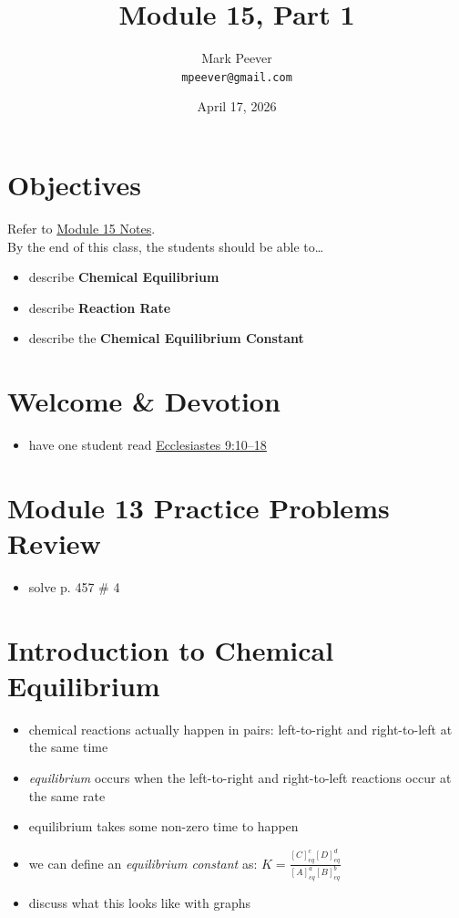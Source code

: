 \documentclass[10pt, oneside]{article}   	%
\title{Module 15, Part 1}
\author{Mark Peever\\ \texttt{mpeever@gmail.com}}
\date{April 17, 2026}
\begin{document}
\maketitle

\section*{Objectives}
Refer to \href{https://drive.google.com/file/d/1_Hv3SaslAcLJrZ5UijrZkMslhQ-wCpJq/view?usp=sharing}{Module 15 Notes}.\\

By the end of this class, the students should be able to\ldots
\begin{itemize}
\item describe \textbf{Chemical Equilibrium}
\item describe \textbf{Reaction Rate}
\item describe the \textbf{Chemical Equilibrium Constant}
\end{itemize}

\section*{Welcome \& Devotion}
\begin{itemize}
\item have one student read \href{https://www.biblegateway.com/passage/?search=Ecclesiastes\%209\%3A10–18\&version=LSB}{Ecclesiastes 9:10--18}
\end{itemize}

\section*{Module 13 Practice Problems Review}

\begin{itemize}
\item solve p. 457 \# 4
\end{itemize}


\section*{Introduction to Chemical Equilibrium}

\begin{itemize}
\item chemical reactions actually happen in pairs: left-to-right and right-to-left at the same time
\item \emph{equilibrium} occurs when the left-to-right and right-to-left reactions occur at the same rate
\item equilibrium takes some non-zero time to happen
\item we can define an \emph{equilibrium constant} as: $K = \frac{ [ C ]_{eq}^{c} [ D ]_{eq}^{d} } { [ A ]_{eq}^{a} [ B ]_{eq}^{b} }$
\item discuss what this looks like with graphs 
\end{itemize}
\end{document}
